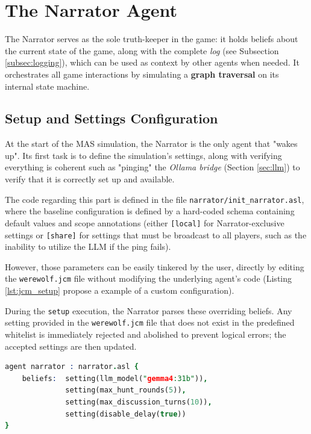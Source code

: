 
\section{The Narrator Agent}
\label{sec:narrator}

The Narrator serves as the sole truth-keeper in the game: it holds beliefs about the current state of the game, along with the complete \emph{log} (see Subsection \ref{subsec:logging}), which can be used as context by other agents when needed. It orchestrates all game interactions by simulating a \textbf{graph traversal} on its internal state machine.

\subsection{Setup and Settings Configuration}
\label{subsec:narrator-setup}

At the start of the MAS simulation, the Narrator is the only agent that "wakes up". Its first task is to define the simulation's settings, along with verifying everything is coherent such as "pinging" the \emph{Ollama bridge} (Section \ref{sec:llm}) to verify that it is correctly set up and available.

The code regarding this part is defined in the file \texttt{narrator/init\_narrator.asl}, where the baseline configuration is defined by a hard-coded schema containing default values and scope annotations (either \texttt{[local]} for Narrator-exclusive settings or \texttt{[share]} for settings that must be broadcast to all players, such as the inability to utilize the LLM if the ping fails). 

However, those parameters can be easily tinkered by the user, directly by editing the \texttt{werewolf.jcm} file without modifying the underlying agent's code (Listing \ref{lst:jcm_setup} propose a example of a custom configuration).

During the \texttt{setup} execution, the Narrator parses these overriding beliefs. Any setting provided in the \texttt{werewolf.jcm} file that does not exist in the predefined whitelist is immediately rejected and abolished to prevent logical errors; the accepted settings are then updated. 

\vspace{1em}
\begin{lstlisting}[frame=single, language=Prolog, caption={Example configuration in the \texttt{werewolf.jcm} file overriding the default Narrator settings: is defined a  specific LLM model, the maximum number of rounds to hunt or speak is changed and all the \emph{artificial} delays are removed.}, label={lst:jcm_setup}]
agent narrator : narrator.asl {
    beliefs:  setting(llm_model("gemma4:31b")),
              setting(max_hunt_rounds(5)),
              setting(max_discussion_turns(10)),
              setting(disable_delay(true))
}
\end{lstlisting}

